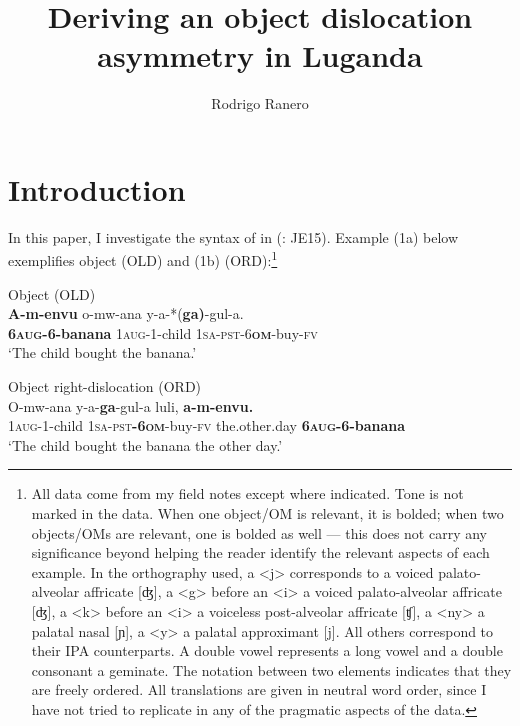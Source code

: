 \documentclass[output=paper,newtxmath,modfonts,nonflat,hidelinks]{langsci/langscibook}
\title{Deriving an object dislocation asymmetry in Luganda}
\author{Rodrigo Ranero\affiliation{University of Maryland}}
\begin{document}
\maketitle

\section{Introduction}\label{sec:ranero:1}

In this paper, I investigate the syntax of  in  (: JE15). Example (1a) below exemplifies object  (OLD) and (1b)  (ORD):\footnote{All data come from my field notes except where indicated. Tone is not marked in the data. When one object/OM is relevant, it is bolded; when two objects/OMs are relevant, one is bolded as well — this does not carry any significance beyond helping the reader identify the relevant aspects of each example. In the orthography used, a <j> corresponds to a voiced palato-alveolar affricate [ʤ], a <g> before an <i> a voiced palato-alveolar affricate [ʤ], a <k> before an <i> a voiceless post-alveolar affricate [ʧ], a <ny> a palatal nasal [ɲ], a <y> a palatal approximant [j]. All others correspond to their IPA counterparts. A double vowel represents a long vowel and a double consonant a geminate. The notation {\textbar}{\textbar} between two elements indicates that they are freely ordered.  All translations are given in neutral word order, since I have not tried to replicate in  any of the pragmatic aspects of the  data.}

\ea\label{ex:ranero:1} 
\ea\label{ex:ranero:1a} Object  (OLD)\\
\gll \textbf{A-m-envu} o-mw-ana y-a-*(\textbf{ga)}{}-gul-a.\\          
\textbf{6\textsc{aug}}\textbf{{}-6-banana} 1\textsc{aug}{}-1-child 1\textsc{sa}{}-\textsc{pst}{}-6\textbf{\textsc{om}}{}-buy\textsc{{}-fv}\\
\glt ‘The child bought the banana.’   

\ex\label{ex:ranero:1b} Object right-dislocation (ORD)\\
\gll O-mw-ana      y-a-\textbf{ga}{}-gul-a       luli,       \textbf{a-m-envu.}\\
1\textsc{aug}{}-1-child \textsc{1sa-pst}\textbf{{}-6}\textbf{\textsc{om}}{}-buy-\textsc{fv} the.other.day \textbf{6\textsc{aug}}\textbf{{}-6-banana}\\
\glt ‘The child bought the banana the other day.’ 
\z
\z
\end{document}
